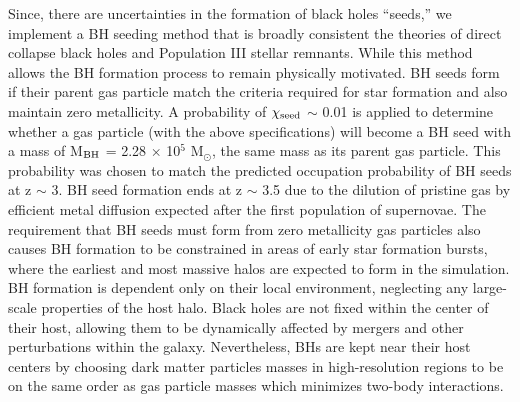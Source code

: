 \documentclass[12pt,headA,chapB]{fiskthesis}
\begin{document}
Since, there are uncertainties in the formation of black holes ``seeds,'' we implement a BH seeding method that is broadly consistent the theories of direct collapse black holes \citep{Couchman1986, Abel2002, Bromm2004} and Population III stellar remnants\citep{Loeb1994, Eisenstein1995, Koushiappas2004, Begelman2006, Lodato2006}. While this method allows the BH formation process to remain physically motivated. BH seeds form if their parent gas particle match the criteria required for star formation and also maintain zero metallicity. \citep{Stinson2006} A probability of $\chi_{\rm seed}$ $\sim$ 0.01 is applied to determine whether a gas particle (with the above specifications) will become a BH seed with a mass of M$_{\rm BH}$ = 2.28 $\times$ 10$^5$ M$_{\odot}$, the same mass as its parent gas particle. This probability was chosen to match the predicted occupation probability of BH seeds at z $\sim$ 3. \citep{Volonteri2008} 
BH seed formation ends at z $\sim$ 3.5 due to the dilution of pristine gas by efficient metal diffusion expected after the first population of supernovae. The requirement that BH seeds must form from zero metallicity gas particles also causes BH formation to be constrained in areas of early star formation bursts, where the earliest and most massive halos are expected to form in the simulation. BH formation is dependent only on their local environment, neglecting any large-scale properties of the host halo. Black holes are not fixed within the center of their host, allowing them to be dynamically affected by mergers and other perturbations within the galaxy. Nevertheless, BHs are kept near their host centers by choosing dark matter particles masses in high-resolution regions to be on the same order as gas particle masses which minimizes two-body interactions. \citep[Change citations?]{Bellovary2010,Zolotov2012}
\end{document}

